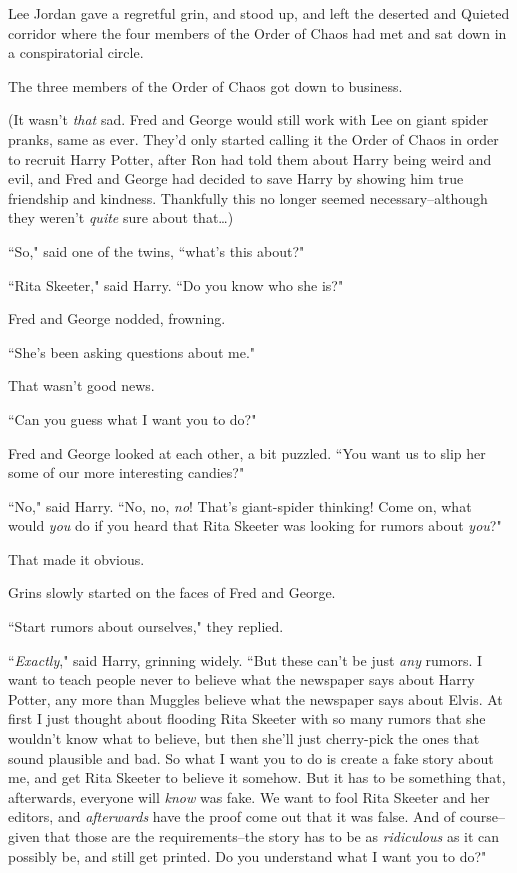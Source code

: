 Lee Jordan gave a regretful grin, and stood up, and left the deserted and Quieted corridor where the four members of the Order of Chaos had met and sat down in a conspiratorial circle.

The three members of the Order of Chaos got down to business.

(It wasn't \emph{that} sad. Fred and George would still work with Lee on giant spider pranks, same as ever. They'd only started calling it the Order of Chaos in order to recruit Harry Potter, after Ron had told them about Harry being weird and evil, and Fred and George had decided to save Harry by showing him true friendship and kindness. Thankfully this no longer seemed necessary\---although they weren't \emph{quite} sure about that{\ldots})

``So," said one of the twins, ``what's this about?"

``Rita Skeeter," said Harry. ``Do you know who she is?"

Fred and George nodded, frowning.

``She's been asking questions about me."

That wasn't good news.

``Can you guess what I want you to do?"

Fred and George looked at each other, a bit puzzled. ``You want us to slip her some of our more interesting candies?"

``No," said Harry. ``No, no, \emph{no}! That's giant-spider thinking! Come on, what would \emph{you} do if you heard that Rita Skeeter was looking for rumors about \emph{you}?"

That made it obvious.

Grins slowly started on the faces of Fred and George.

``Start rumors about ourselves," they replied.

``\emph{Exactly}," said Harry, grinning widely. ``But these can't be just \emph{any} rumors. I want to teach people never to believe what the newspaper says about Harry Potter, any more than Muggles believe what the newspaper says about Elvis. At first I just thought about flooding Rita Skeeter with so many rumors that she wouldn't know what to believe, but then she'll just cherry-pick the ones that sound plausible and bad. So what I want you to do is create a fake story about me, and get Rita Skeeter to believe it somehow. But it has to be something that, afterwards, everyone will \emph{know} was fake. We want to fool Rita Skeeter and her editors, and \emph{afterwards} have the proof come out that it was false. And of course\---given that those are the requirements\---the story has to be as \emph{ridiculous} as it can possibly be, and still get printed. Do you understand what I want you to do?"

